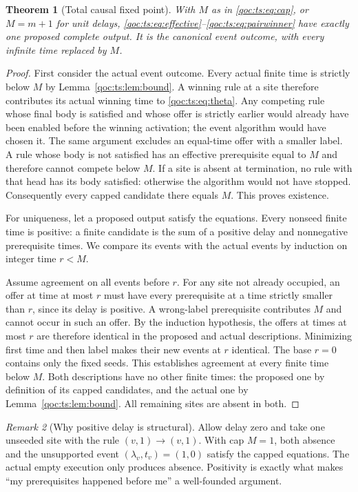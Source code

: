 \documentclass[11pt,letterpaper]{article}
\newtheorem{theorem}{Theorem}[section]
\theoremstyle{definition}
\theoremstyle{remark}
\newtheorem{remark}[theorem]{Remark}
\begin{document}
\begin{theorem}[Total causal fixed point]\label{qoc:ts:thm:fixedpoint}
With $M$ as in \eqref{qoc:ts:eq:cap}, or $M=m+1$ for unit delays,
\eqref{qoc:ts:eq:effective}--\eqref{qoc:ts:eq:pairwinner} have exactly one proposed
complete output. It is the canonical event outcome, with every infinite
time replaced by $M$.
\end{theorem}
\begin{proof}
First consider the actual event outcome. Every actual finite time is
strictly below $M$ by Lemma~\ref{qoc:ts:lem:bound}. A winning rule at a site
therefore contributes its actual winning time to \eqref{qoc:ts:eq:theta}.
Any competing rule whose final body is satisfied and whose offer is
strictly earlier would already have been enabled before the winning
activation; the event algorithm would have chosen it. The same argument
excludes an equal-time offer with a smaller label. A rule whose body is
not satisfied has an effective prerequisite equal to $M$ and therefore
cannot compete below $M$. If a site is absent at termination, no rule
with that head has its body satisfied: otherwise the algorithm would
not have stopped. Consequently every capped candidate there equals $M$.
This proves existence.

For uniqueness, let a proposed output satisfy the equations. Every
nonseed finite time is positive: a finite candidate is the sum of a
positive delay and nonnegative prerequisite times. We compare its events
with the actual events by induction on integer time $r<M$.

Assume agreement on all events before $r$. For any site not already
occupied, an offer at time at most $r$ must have every prerequisite at a
time strictly smaller than $r$, since its delay is positive. A wrong-label
prerequisite contributes $M$ and cannot occur in such an offer. By the
induction hypothesis, the offers at times at most $r$ are therefore
identical in the proposed and actual descriptions. Minimizing first time
and then label makes their new events at $r$ identical. The base $r=0$
contains only the fixed seeds. This establishes agreement at every finite
time below $M$. Both descriptions have no other finite times: the proposed
one by definition of its capped candidates, and the actual one by
Lemma~\ref{qoc:ts:lem:bound}. All remaining sites are absent in both.
\end{proof}

\begin{remark}[Why positive delay is structural]
Allow delay zero and take one unseeded site with the rule
$(v,1)\to(v,1)$. With cap $M=1$, both absence and the unsupported event
$(\lambda_v,t_v)=(1,0)$ satisfy the capped equations. The actual empty
execution only produces absence. Positivity is exactly what makes
``my prerequisites happened before me'' a well-founded argument.
\end{remark}
\end{document}
